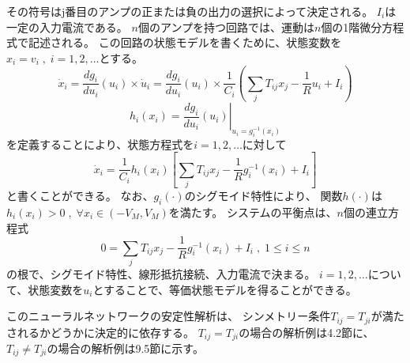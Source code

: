 \documentclass{jsarticle}
\begin{document}
    その符号はj番目のアンプの正または負の出力の選択によって決定される。
    $I_i$は一定の入力電流である。
    $n$個のアンプを持つ回路では、運動は$n$個の1階微分方程式で記述される。
    この回路の状態モデルを書くために、状態変数を$x_i = v_i\;,\;i=1,2,\dots$とする。
    \begin{equation*}
        \dot x_i = \frac{dg_i}{du_i}(u_i) \times \dot u_i 
        = \frac{dg_i}{du_i}(u_i) \times \frac{1}{C_i}\left(\sum_j T_{ij}x_j-\frac{1}{R}u_i+I_i\right)  
    \end{equation*}
    \begin{equation*}
        \left.h_i(x_i)=\frac{dg_i}{du_i}(u_i)\right|_{u_i=g_i^{-1}(x_i)}
    \end{equation*}
    を定義することにより、状態方程式を$i=1,2,\dots$に対して 
    \begin{equation*}
        \dot x_i = \frac{1}{C_i}h_i(x_i)\left[\sum_j T_{ij}x_j-\frac{1}{R}g_i^{-1}(x_i)+I_i\right]   
    \end{equation*}
    と書くことができる。
    なお、$g_i(\cdot)$のシグモイド特性により、
    関数$h(\cdot)$は$h_i(x_i)>0\;,\;\forall x_i \in (-V_M,V_M)$を満たす。
    システムの平衡点は、$n$個の連立方程式
    \begin{equation*}
        0=\sum_j T_{ij}x_j-\frac{1}{R}g_i^{-1}(x_i)+I_i \;,\;1\leq i\leq n
    \end{equation*}
    の根で、シグモイド特性、線形抵抗接続、入力電流で決まる。
    $i=1,2,\dots$について、状態変数を$u_i$とすることで、等価状態モデルを得ることができる。
    
    このニューラルネットワークの安定性解析は、
    シンメトリー条件$T_{ij} = T_{ji}$が満たされるかどうかに決定的に依存する。
    $T_{ij} = T_{ji}$の場合の解析例は4.2節に、$T_{ij} \neq T_{ji}$の場合の解析例は9.5節に示す。
\end{document}
